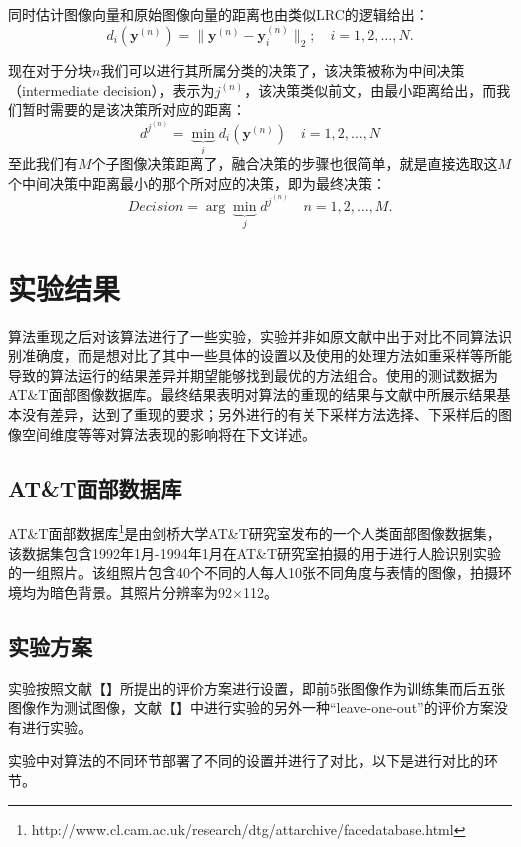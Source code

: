 \documentclass[UTF8]{ctexart}
\begin{document}
\par
同时估计图像向量和原始图像向量的距离也由类似LRC的逻辑给出：
\begin{equation}
    d_i(\mathbf{y}^{(n)})=\|\mathbf{y}^{(n)}-\mathbf{y}^{(n)}_i\|_2;\quad i=1,2,\dots,N.
\end{equation}
\par
现在对于分块\(n\)我们可以进行其所属分类的决策了，该决策被称为中间决策（intermediate decision），表示为\(j^{(n)}\)，该决策类似前文，由最小距离给出，而我们暂时需要的是该决策所对应的距离：
\begin{equation}
    d^{j^{(n)}}=\underbrace{\min}_i d_i(\mathbf{y}^{(n)})\quad i=1,2,\dots,N
\end{equation}
至此我们有\(M\)个子图像决策距离了，融合决策的步骤也很简单，就是直接选取这\(M\)个中间决策中距离最小的那个所对应的决策，即为最终决策：
\begin{equation}
    Decision=\arg{\underbrace{\min}_j}d^{j^{(n)}}\quad n=1,2,\dots,M.
\end{equation}
\section{实验结果}\label{sec-3}
算法重现之后对该算法进行了一些实验，实验并非如原文献中出于对比不同算法识别准确度，而是想对比了其中一些具体的设置以及使用的处理方法如重采样等所能导致的算法运行的结果差异并期望能够找到最优的方法组合。使用的测试数据为AT\&T面部图像数据库。最终结果表明对算法的重现的结果与文献中所展示结果基本没有差异，达到了重现的要求；另外进行的有关下采样方法选择、下采样后的图像空间维度等等对算法表现的影响将在下文详述。
\subsection{AT\&T面部数据库}
AT\&T面部数据库\footnote{http://www.cl.cam.ac.uk/research/dtg/attarchive/facedatabase.html}是由剑桥大学AT\&T研究室发布的一个人类面部图像数据集，该数据集包含1992年1月-1994年1月在AT\&T研究室拍摄的用于进行人脸识别实验的一组照片。该组照片包含40个不同的人每人10张不同角度与表情的图像，拍摄环境均为暗色背景。其照片分辨率为92\(\times\)112。
\subsection{实验方案}
实验按照文献【】所提出的评价方案进行设置，即前5张图像作为训练集而后五张图像作为测试图像，文献【】中进行实验的另外一种“leave-one-out”的评价方案没有进行实验。\par
实验中对算法的不同环节部署了不同的设置并进行了对比，以下是进行对比的环节。
\end{document}
